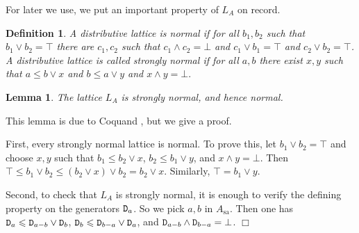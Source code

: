 \documentclass[12pt]{article}
\newcommand{\sa}{\ensuremath{_{\mathrm{sa}}}}
\newcommand{\prop}[1]{\ensuremath{\mbox{\texttt{#1}}}}
\newtheorem{lemma}[theorem]{Lemma}
\newtheorem{definition}[theorem]{Definition}
\newenvironment{proof}[1][Proof]%
{ \begin{trivlist}%
  \item[\hskip \labelsep {\bfseries #1}]%
}%
{ \end{trivlist}%
}
\newcommand{\qed}{\nobreak\hfill$\Box$}
\begin{document}
For later we use, we put an important property of $L_A$ on record.
\begin{definition}\label{defnormal}
  A distributive lattice  is \emph{normal} if for all $b_1, b_2$ such that
  $b_1 \vee b_2 = \top$ there are $c_1, c_2$ such that $c_1 \wedge c_2 = \bot$
  and $c_1 \vee b_1 = \top$ and $c_2 \vee b_2 = \top$. A distributive lattice
is called \emph{strongly normal} if for all $a, b$ there exist $x, y$ such
that $a \leqslant b \vee x$ and $b \leqslant a \vee y$ and $x \wedge y = \bot
.$
\end{definition}
\begin{lemma}
  The lattice $L_A$ is strongly normal, and hence normal.
\end{lemma}
This lemma is due to Coquand \cite[Thm.\ 1.11]{coquand05}, but we give a proof. 
\begin{proof}
First,   every strongly normal lattice is normal.  To prove this,   let $b_1 \vee b_2 = \top$ and choose $x, y$ such that  $b_1 \leqslant b_2 \vee
  x$, $b_2 \leqslant b_1 \vee y$, and $x \wedge y = \bot .$ Then $\top
  \leqslant b_1 \vee b_2 \leqslant (b_2 \vee x) \vee b_2 = b_2 \vee x$.
  Similarly, $\top = b_1 \vee y$.

Second, to check that $L_A$  is strongly normal,  it is enough to verify the defining property on the generators $\prop{D}_a$.
So we pick $a,b$ in $A\sa$. Then one has $\prop{D}_a \leqslant \prop{D}_{a-b} \vee \prop{D}_b$,  $\prop{D}_b \leqslant \prop{D}_{b-a} \vee \prop{D}_a$, 
and  $\prop{D}_{a-b} \wedge \prop{D}_{b-a} = \bot$.
 \qed\end{proof}
\end{document}
